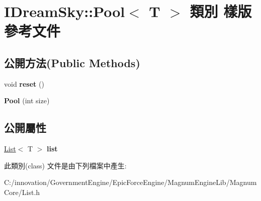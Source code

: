 \hypertarget{class_i_dream_sky_1_1_pool}{}\section{I\+Dream\+Sky\+:\+:Pool$<$ T $>$ 類別 樣版 參考文件}
\label{class_i_dream_sky_1_1_pool}
\subsection*{公開方法(Public Methods)}
\begin{DoxyCompactItemize}
\item 
void {\bfseries reset} ()\hypertarget{class_i_dream_sky_1_1_pool_acc8af898f2852195115c069461991057}{}\label{class_i_dream_sky_1_1_pool_acc8af898f2852195115c069461991057}

\item 
{\bfseries Pool} (int size)\hypertarget{class_i_dream_sky_1_1_pool_a788a85232dc2291b94d3c620bd221478}{}\label{class_i_dream_sky_1_1_pool_a788a85232dc2291b94d3c620bd221478}

\end{DoxyCompactItemize}
\subsection*{公開屬性}
\begin{DoxyCompactItemize}
\item 
\hyperlink{class_i_dream_sky_1_1_list}{List}$<$ T $>$ {\bfseries list}\hypertarget{class_i_dream_sky_1_1_pool_a35227abe1ef186234ceccd7fd7509d77}{}\label{class_i_dream_sky_1_1_pool_a35227abe1ef186234ceccd7fd7509d77}

\end{DoxyCompactItemize}


此類別(class) 文件是由下列檔案中產生\+:\begin{DoxyCompactItemize}
\item 
C\+:/innovation/\+Government\+Engine/\+Epic\+Force\+Engine/\+Magnum\+Engine\+Lib/\+Magnum\+Core/List.\+h\end{DoxyCompactItemize}
